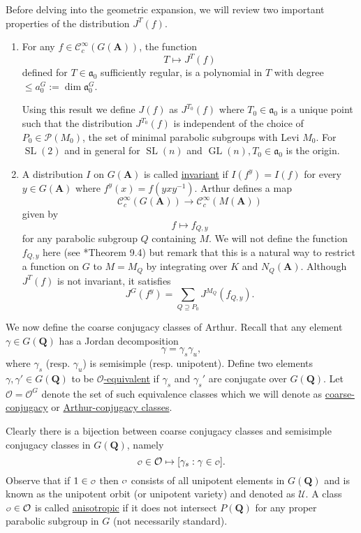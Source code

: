\documentclass[11pt]{amsart}
\def\A{\mathbf A}
\def\Q{\mathbf Q}
\def\CCC{\mathcal C}
\def\PPP{\mathcal P}
\def\O{\mathcal O}
\def\o{\scalebox{0.8}{$\scriptstyle\mathcal{O}$}}
\def\UUU{\mathcal U}
\def\aaa{\mathfrak a}
\def\dim{\operatorname{dim}}
\def\gl{\operatorname{GL}}
\def\sl{\operatorname{SL}}
\theoremstyle{remark}
\begin{document}
Before delving into the geometric expansion, we will review two important properties of the distribution $J^T(f)$. 
\begin{enumerate}
	\item For any $f \in \CCC_c^\infty(G(\A))$, the function
		\[ T \mapsto J^T(f) \]
		defined for $T \in \aaa_0$ sufficiently regular, is a polynomial in $T$ with degree $\leq a_0^G := \dim \aaa_0^G$. 
		
		Using this result we define $J(f)$ as $J^{T_0}(f)$ where $T_0 \in \aaa_0$ is a unique point such that the distribution $J^{T_0}(f)$ is independent of the choice of $P_0 \in \PPP(M_0)$, the set of minimal parabolic subgroups with Levi $M_0$. For $\sl(2)$ and in general for $\sl(n)$ and $\gl(n), T_0 \in \aaa_0$ is the origin.
		
	\item A distribution $I$ on $G(\A)$ is called \underline{invariant} if $I(f^y) = I(f)$ for every $y \in G(\A)$ where $f^y(x) = f(yxy^{-1})$. Arthur defines a map
	\[ \CCC_c^\infty(G(\A)) \to \CCC_c^\infty(M(\A)) \]
	given by
	\[ f \mapsto f_{Q, y} \]
	for any parabolic subgroup $Q$ containing $M$. We will not define the function $f_{Q, y}$ here (see \cite{clay}*{Theorem 9.4}) but remark that this is a natural way to restrict a function on $G$ to $M = M_Q$ by integrating over $K$ and $N_Q(\A)$. Although $J^T(f)$ is not invariant, it satisfies
	\[ J^G(f^y) = \sum_{Q \supseteq P_0} J^{M_Q}(f_{Q, y}). \]
\end{enumerate}

We now define the coarse conjugacy classes of Arthur. Recall that any element $\gamma \in G(\Q)$ has a Jordan decomposition
\[ \gamma = \gamma_s \gamma_u, \]
where $\gamma_s$ (resp. $\gamma_u$) is semisimple (resp. unipotent). Define two elements $\gamma, \gamma' \in G(\Q)$ to be \underline{$\O$-equivalent} if $\gamma_s$ and $\gamma_s'$ are conjugate over $G(\Q)$. Let $\O = \O^G$ denote the set of such equivalence classes which we will denote as \underline{coarse-conjugacy} or \underline{Arthur-conjugacy classes}. 

Clearly there is a bijection between coarse conjugacy classes and semisimple conjugacy classes in $G(\Q)$, namely 
\[ \o \in \O \mapsto [\gamma_s : \gamma \in \o ]. \]
Observe that if $1 \in \o$ then $\o$ consists of all unipotent elements in $G(\Q)$ and is known as the unipotent orbit (or unipotent variety) and denoted as $\UUU$. A class $\o \in \O$ is called \underline{anisotropic} if it does not intersect $P(\Q)$ for any proper parabolic subgroup in $G$ (not necessarily standard). 
\end{document}

